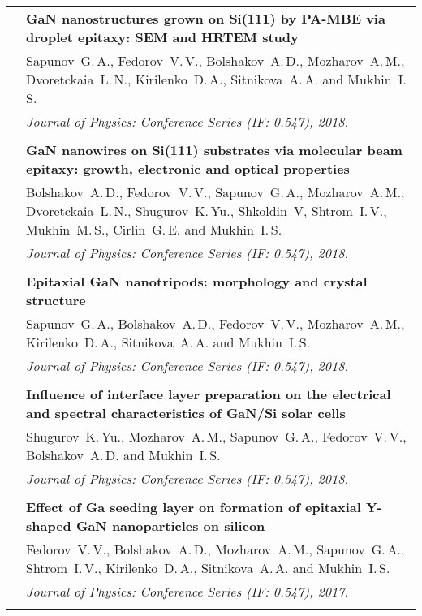 \documentclass[letterpaper, 11pt]{article}
\begin{document}
\begin{longtable}{p{1.3in}p{4.8in}}
        & \textbf{GaN nanostructures grown on Si(111) by PA-MBE via droplet
        epitaxy: SEM and HRTEM study} \\
        & Sapunov~G.\,A., Fedorov~V.\,V., Bolshakov~A.\,D., Mozharov~A.\,M.,
        Dvoretckaia~L.\,N., Kirilenko~D.\,A., Sitnikova~A.\,A. and
        Mukhin~I.\,S. \\
		& \textit{Journal of Physics: Conference Series (IF: 0.547), 2018.}\\
		& \\
		
        & \textbf{GaN nanowires on Si(111) substrates via molecular beam
        epitaxy: growth, electronic and optical properties} \\
        & Bolshakov~A.\,D., Fedorov~V.\,V., Sapunov~G.\,A., Mozharov~A.\,M.,
        Dvoretckaia~L.\,N., Shugurov~K.\,Yu., Shkoldin~V, Shtrom~I.\,V.,
        Mukhin~M.\,S., Cirlin~G.\,E. and Mukhin~I.\,S. \\
		& \textit{Journal of Physics: Conference Series (IF: 0.547), 2018.}\\
		& \\
		
        & \textbf{Epitaxial GaN nanotripods: morphology and crystal structure}
        \\
        & Sapunov~G.\,A., Bolshakov~A.\,D., Fedorov~V.\,V.,  Mozharov~A.\,M.,
        Kirilenko~D.\,A., Sitnikova~A.\,A. and Mukhin~I.\,S. \\
		& \textit{Journal of Physics: Conference Series (IF: 0.547), 2018.}\\
		& \\
		
        & \textbf{Influence of interface layer preparation on the electrical
        and spectral characteristics of GaN/Si solar cells} \\
        & Shugurov~K.\,Yu., Mozharov~A.\,M., Sapunov~G.\,A., Fedorov~V.\,V.,
        Bolshakov~A.\,D. and Mukhin~I.\,S. \\
		& \textit{Journal of Physics: Conference Series (IF: 0.547), 2018.}\\
		& \\
		
        & \textbf{Effect of Ga seeding layer on formation of epitaxial Y-shaped
        GaN nanoparticles on silicon} \\
        & Fedorov~V.\,V., Bolshakov~A.\,D., Mozharov~A.\,M., Sapunov~G.\,A.,
        Shtrom~I.\,V., Kirilenko~D.\,A., Sitnikova~A.\,A. and Mukhin~I.\,S. \\
        & \textit{Journal of Physics: Conference Series (IF: 0.547), 2017.}\\
		& \\


\end{longtable}
\end{document}
